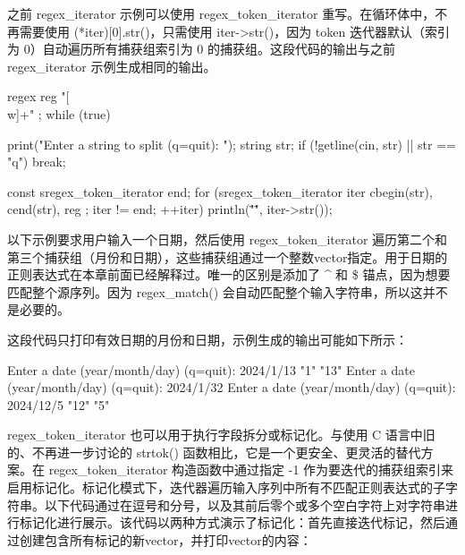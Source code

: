 
之前 regex\_iterator 示例可以使用 regex\_token\_iterator 重写。在循环体中，不再需要使用 (*iter)[0].str()，只需使用 iter->str()，因为 token 迭代器默认（索引为 0）自动遍历所有捕获组索引为 0 的捕获组。这段代码的输出与之前 regex\_iterator 示例生成相同的输出。

\begin{cpp}
regex reg { "[\\w]+" };
while (true) {
    print("Enter a string to split (q=quit): ");
    string str;
    if (!getline(cin, str) || str == "q") { break; }

    const sregex_token_iterator end;
    for (sregex_token_iterator iter { cbegin(str), cend(str), reg };
    iter != end; ++iter) {
        println("\"{}\"", iter->str());
    }
}
\end{cpp}

以下示例要求用户输入一个日期，然后使用 regex\_token\_iterator 遍历第二个和第三个捕获组（月份和日期），这些捕获组通过一个整数vector指定。用于日期的正则表达式在本章前面已经解释过。唯一的区别是添加了 \^{} 和 \$ 锚点，因为想要匹配整个源序列。因为 regex\_match() 会自动匹配整个输入字符串，所以这并不是必要的。


这段代码只打印有效日期的月份和日期，示例生成的输出可能如下所示：

\begin{shell}
Enter a date (year/month/day) (q=quit): 2024/1/13
"1"
"13"
Enter a date (year/month/day) (q=quit): 2024/1/32
Enter a date (year/month/day) (q=quit): 2024/12/5
"12"
"5"
\end{shell}

regex\_token\_iterator 也可以用于执行字段拆分或标记化。与使用 C 语言中旧的、不再进一步讨论的 strtok() 函数相比，它是一个更安全、更灵活的替代方案。在 regex\_token\_iterator 构造函数中通过指定 -1 作为要迭代的捕获组索引来启用标记化。标记化模式下，迭代器遍历输入序列中所有不匹配正则表达式的子字符串。以下代码通过在逗号和分号，以及其前后零个或多个空白字符上对字符串进行标记化进行展示。该代码以两种方式演示了标记化：首先直接迭代标记，然后通过创建包含所有标记的新vector，并打印vector的内容：

